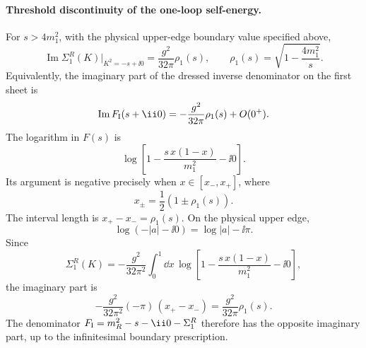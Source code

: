 \paragraph{Threshold discontinuity of the one-loop self-energy.}
For \(s>4m_1^2\), with the physical upper-edge boundary value specified
above,
\[
  \operatorname{Im}\Sigma_1^R(K)\big|_{K^2=-s+\ii0}
  =
  \frac{g^2}{32\pi}\rho_1(s),
  \qquad
  \rho_1(s)=\sqrt{1-\frac{4m_1^2}{s}} .
\]
Equivalently, the imaginary part of the dressed inverse denominator on the
first sheet is
\[
  \operatorname{Im}F_{\rm I}(s+\ii0)
  =
  -\frac{g^2}{32\pi}\rho_1(s)+O(0^+).
\]
The logarithm in \(F(s)\) is
\[
  \log\left[1-\frac{s\,x(1-x)}{m_1^2}-\ii0\right].
\]
Its argument is negative precisely when \(x\in[x_-,x_+]\), where
\[
  x_\pm=\frac12(1\pm\rho_1(s)).
\]
The interval length is \(x_+-x_-=\rho_1(s)\).  On the physical upper edge,
\[
  \log(-|a|-\ii0)=\log|a|-\ii\pi .
\]
Since
\[
  \Sigma_1^R(K)
  =
  -\frac{g^2}{32\pi^2}
  \int_0^1\dd x\,
  \log\left[
    1-\frac{s\,x(1-x)}{m_1^2}-\ii0
  \right],
\]
the imaginary part is
\[
  -\frac{g^2}{32\pi^2}(-\pi)\,(x_+-x_-)
  =
  \frac{g^2}{32\pi}\rho_1(s).
\]
The denominator \(F_{\rm I}=m_R^2-s-\ii0-\Sigma_1^R\) therefore has the
opposite imaginary part, up to the infinitesimal boundary prescription.

